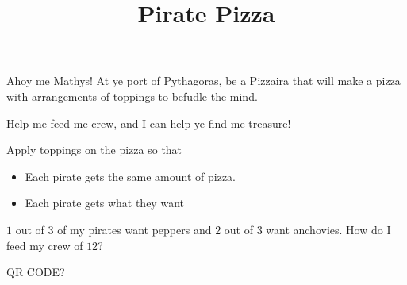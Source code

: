 \documentclass{../exhibit}
\title{Pirate Pizza}
\begin{document}
\begin{context}
  Ahoy me Mathys! At ye port of Pythagoras, be a Pizzaira that will
  make a pizza with arrangements of toppings to befudle the mind.


  \vspace{1cm}

  
  Help me feed me crew, and I can help ye find me treasure!
\end{context}



\begin{directions}
  Apply toppings on the pizza so that
  \begin{itemize}
  \item Each pirate gets the same amount of pizza.
  \item Each pirate gets what they want
  \end{itemize}
\end{directions}



\begin{example}
  $1$ out of $3$ of my pirates want peppers and $2$ out of $3$ want
  anchovies. How do I feed my crew of $12$?
\begin{center}
\end{center}
\end{example}



\begin{mathConnections}
  QR CODE?
\end{mathConnections}
\end{document}
